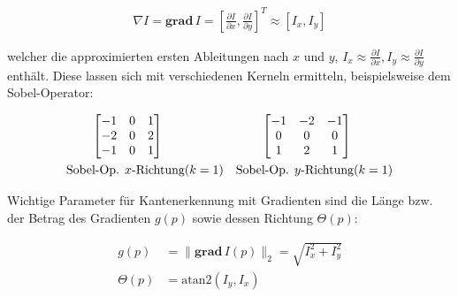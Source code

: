\begin{align}
    \nabla I = \mathbf{grad}\, I = \left[ \frac{\partial I}{\partial x}, \frac{\partial I}{\partial y} \right]^T \approx \left[ I_x, I_y \right]
\end{align}

welcher die approximierten ersten Ableitungen nach $x$ und $y$, $I_x \approx \frac{\partial I}{\partial x}, I_y \approx \frac{\partial I}{\partial y}$ enthält.
Diese lassen sich mit verschiedenen Kerneln ermitteln, beispielsweise dem Sobel-Operator:

\begin{align}
    & \qquad \begin{bmatrix}
        -1 & 0 & 1 \\
         -2 & 0 & 2 \\
        -1 & 0 & 1
    \end{bmatrix} && \qquad
    \begin{bmatrix}
        -1 & -2 & -1 \\
         0 & 0 & 0 \\
        1 & 2 & 1
    \end{bmatrix}\\
    & \text{Sobel-Op. }x\text{-Richtung}(k=1) && \text{Sobel-Op. }y\text{-Richtung}(k=1)\notag
\end{align}

Wichtige Parameter für Kantenerkennung mit Gradienten sind die Länge bzw. der Betrag des Gradienten $g(p)$ sowie dessen Richtung $\Theta(p)$:

\begin{align}
    g(p)& = \| \mathbf{grad}\, I(p) \|_2 = \sqrt{I_x^2 + I_y^2}\\
    \Theta(p)& = \mathrm{atan2}(I_y, I_x)
\end{align}

